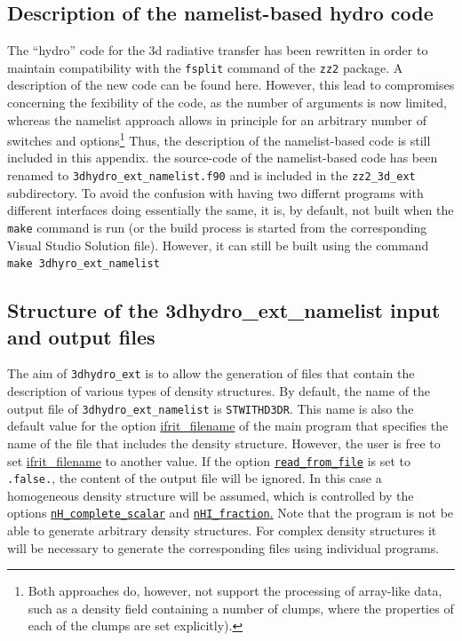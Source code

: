 \documentclass[a4paper,10pt]{article}
\begin{document}
\begin{appendix}

\section{Description of the namelist-based hydro code}
The ``hydro'' code for the 3d radiative transfer has been rewritten in order 
to maintain compatibility with the \texttt{fsplit} command of the \texttt{zz2}
package. A description of the new code can be found here. However, this lead to 
compromises concerning the fexibility of the code, as the number of arguments is
now limited, whereas the namelist approach allows in principle for an arbitrary 
number of switches and options\footnote{Both approaches do, however, not support the 
processing of array-like data, such as a density field containing a number of
clumps, where the properties of each of the clumps are set explicitly).} Thus, 
the description of the namelist-based code is still included in this appendix.
the source-code of the namelist-based code has been renamed to 
\texttt{3dhydro\_ext\_namelist.f90} and is included in the \texttt{zz2\_3d\_ext}
subdirectory. To avoid the confusion with having two differnt programs with 
different interfaces doing essentially the same, it is, by default, not built when
the \texttt{make} command is run (or the build process is started from the 
corresponding Visual Studio Solution file).
However, it can still be built using the command\\
\texttt{make 3dhyro\_ext\_namelist}
 
\subsection{Structure of the 3dhydro\_ext\_namelist input and output files}
The aim of  \texttt{3dhydro\_ext} is to allow the generation of files that 
contain the description of various types of density structures.
By default, the name of the output file of \texttt{3dhydro\_ext\_namelist} is 
\texttt{STWITHD3DR}. This name is also the default value for the option 
\hyperref[opt:ifritfilename]{ifrit\_filename} of the main program that specifies 
the name of the file that includes the density structure. However, the user is 
free to set 
\hyperref[opt:ifritfilename]{ifrit\_filename} to another value. If the option 
\hyperref[opt:readfromfile]{\texttt{read\_from\_file}} is set to 
\texttt{.false.},
the content of the output file will be ignored. In this case a homogeneous  
density structure will be assumed, which is controlled by the options 
\hyperref[opt:nhcompletescalar]{\texttt{nH\_complete\_scalar}}
and \hyperref[opt:nhifraction]{\texttt{nHI\_fraction}.}
Note that the program is not be able to generate arbitrary density structures.  
For complex density structures it will be necessary to generate the 
corresponding files using individual programs.


\end{appendix}
\end{document}
